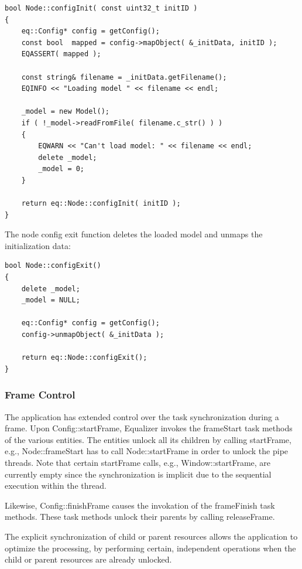 \documentclass[10pt,a4]{scrartcl}
\begin{document}
{\footnotesize\begin{lstlisting}
bool Node::configInit( const uint32_t initID )
{
    eq::Config* config = getConfig();
    const bool  mapped = config->mapObject( &_initData, initID );
    EQASSERT( mapped );

    const string& filename = _initData.getFilename();
    EQINFO << "Loading model " << filename << endl;

    _model = new Model();
    if ( !_model->readFromFile( filename.c_str() ) )
    {
        EQWARN << "Can't load model: " << filename << endl;
        delete _model;
        _model = 0;
    }
    
    return eq::Node::configInit( initID );
}
\end{lstlisting}}%

The node config exit function deletes the loaded model and unmaps the
initialization data: 

{\footnotesize\begin{lstlisting}
bool Node::configExit()
{
    delete _model;
    _model = NULL;

    eq::Config* config = getConfig();
    config->unmapObject( &_initData );

    return eq::Node::configExit();
}
\end{lstlisting}}

\subsubsection{\label{sNodeFrame}Frame Control}

The application has extended control over the task synchronization
during a frame. Upon \textsf{Config::startFrame}, Equalizer invokes the
\textsf{frameStart} task methods of the various entities. The entities
unlock all its children by calling \textsf{startFrame}, e.g.,
\textsf{Node::frameStart} has to call \textsf{Node::startFrame} in order
to unlock the pipe threads. Note that certain \textsf{startFrame} calls,
e.g., \textsf{Window::startFrame}, are currently empty since the
synchronization is implicit due to the sequential execution within the
thread.

Likewise, \textsf{Config::finishFrame} causes the invokation of the
\textsf{frameFinish} task methods. These task methods unlock their
parents by calling \textsf{releaseFrame}.

The explicit synchronization of child or parent resources allows the
application to optimize the processing, by performing certain, independent
operations when the child or parent resources are already unlocked.
\end{document}
